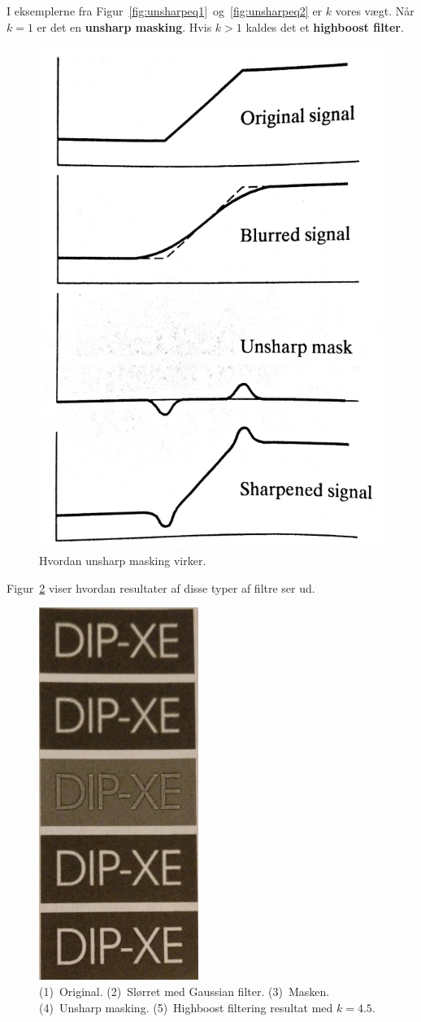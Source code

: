 I eksemplerne fra Figur~\ref{fig:unsharpeq1}~og~\ref{fig:unsharpeq2} er $k$ vores vægt. Når $k = 1$ er det en \textbf{unsharp masking}. Hvis $k > 1$ kaldes det et \textbf{highboost filter}.

\begin{figure}[H]
	\centering
	\includegraphics[width=0.4\linewidth]{figs/spm02/unsharp}
	\caption{Hvordan unsharp masking virker.}
	\label{fig:unsharp}
\end{figure}

Figur~\ref{fig:highboost} viser hvordan resultater af disse typer af filtre ser ud.

\begin{figure}[h]
	\centering
	\includegraphics[width=0.2\linewidth]{figs/spm02/highboost}
	\caption{(1)~Original. (2)~Slørret med Gaussian filter. (3)~Masken. (4)~Unsharp masking. (5)~Highboost filtering resultat med $k = 4.5$.}
	\label{fig:highboost}
\end{figure}
